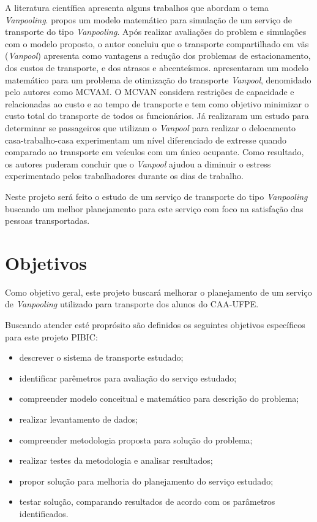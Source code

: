 \documentclass[11pt,a4paper]{article}
\begin{document}
A literatura científica apresenta alguns trabalhos que abordam o tema \emph{Vanpooling}. \cite{Nassar1986} propos um modelo matemático para simulação de um serviço de transporte do tipo \emph{Vanpooling}. Após realizar avaliações do problem e simulações com o modelo proposto, o autor concluiu que o transporte compartilhado em vãs (\emph{Vanpool}) apresenta como vantagens a redução dos problemas de estacionamento, dos custos de transporte, e dos atrasos e abcenteísmos. \cite{KaanOlinick2013} apresentaram um modelo matemático para um problema de otimização do transporte \emph{Vanpool}, denomidado pelo autores como MCVAM. O MCVAN considera restrições de capacidade e relacionadas ao custo e ao tempo de transporte e tem como objetivo minimizar o custo total do transporte de todos os funcionários.  Já \cite{DitmoreDeming2018} realizaram um estudo para determinar se passageiros que utilizam o \emph{Vanpool} para realizar o delocamento casa-trabalho-casa experimentam um nível diferenciado de extresse quando comparado ao transporte em veículos com um único ocupante. Como resultado, os autores puderam concluir que o \emph{Vanpool} ajudou a diminuir o estress experimentado pelos trabalhadores durante os dias de trabalho.

Neste projeto será feito o estudo de um serviço de transporte do tipo \emph{Vanpooling} buscando um melhor planejamento para este serviço com foco na satisfação das pessoas transportadas.

\section{Objetivos}

Como objetivo geral, este projeto buscará melhorar o planejamento de um serviço de \emph{Vanpooling} utilizado para transporte dos alunos do CAA-UFPE.

Buscando atender esté proprósito são definidos os seguintes objetivos específicos para este projeto PIBIC:

\begin{itemize}
\item descrever o sistema de transporte estudado;
\item identificar parêmetros para avaliação do serviço estudado;
\item compreender modelo conceitual e matemático para descrição do problema;
\item realizar levantamento de dados;
\item compreender metodologia proposta para solução do problema;
\item realizar testes da metodologia e analisar resultados;
\item propor solução para melhoria do planejamento do serviço estudado;
\item testar solução, comparando resultados de acordo com os parâmetros identificados.
\end{itemize}
\end{document}
